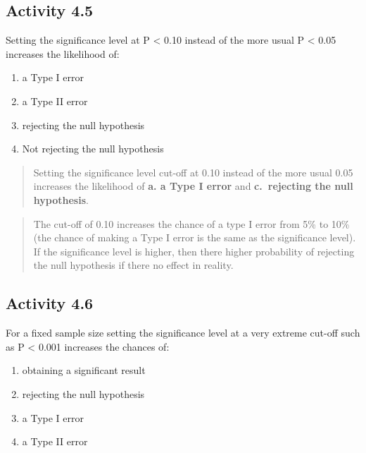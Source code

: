 \documentclass[
]{memoir}
\providecommand{\tightlist}{%
  \setlength{\itemsep}{0pt}\setlength{\parskip}{0pt}}
\begin{document}
\hypertarget{activity-4.5}{%
\subsection*{Activity 4.5}\label{activity-4.5}}

Setting the significance level at P \textless{} 0.10 instead of the more usual P \textless{} 0.05 increases the likelihood of:

\begin{enumerate}
\def\labelenumi{\alph{enumi})}
\tightlist
\item
  a Type I error
\item
  a Type II error
\item
  rejecting the null hypothesis
\item
  Not rejecting the null hypothesis
\end{enumerate}

\begin{quote}
Setting the significance level cut-off at 0.10 instead of the more usual 0.05 increases the likelihood of
\textbf{a. a Type I error} and \textbf{c.~rejecting the null hypothesis}.
\end{quote}

\begin{quote}
The cut-off of 0.10 increases the chance of a type I error from 5\% to 10\% (the chance of making a Type I error is the same as the significance level). If the significance level is higher, then there higher probability of rejecting the null hypothesis if there no effect in reality.
\end{quote}

\hypertarget{activity-4.6}{%
\subsection*{Activity 4.6}\label{activity-4.6}}

For a fixed sample size setting the significance level at a very extreme cut-off such as P \textless{} 0.001 increases the chances of:

\begin{enumerate}
\def\labelenumi{\alph{enumi})}
\tightlist
\item
  obtaining a significant result
\item
  rejecting the null hypothesis
\item
  a Type I error
\item
  a Type II error
\end{enumerate}
\end{document}
